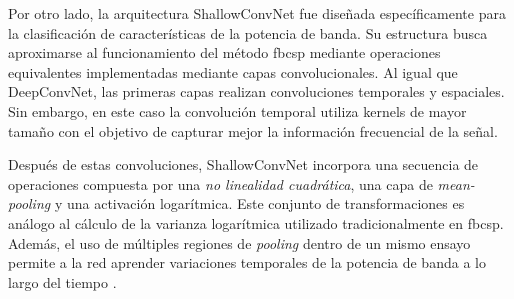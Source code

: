 Por otro lado, la arquitectura ShallowConvNet fue diseñada específicamente para la clasificación de características de la potencia de banda. Su estructura busca aproximarse al funcionamiento del método \acrshort{fbcsp} mediante operaciones equivalentes implementadas mediante capas convolucionales. Al igual que DeepConvNet, las primeras capas realizan convoluciones temporales y espaciales. Sin embargo, en este caso la convolución temporal utiliza kernels de mayor tamaño con el objetivo de capturar mejor la información frecuencial de la señal.

Después de estas convoluciones, ShallowConvNet incorpora una secuencia de operaciones compuesta por una \textit{no linealidad cuadrática}, una capa de \textit{mean-pooling} y una activación logarítmica. Este conjunto de transformaciones es análogo al cálculo de la varianza logarítmica utilizado tradicionalmente en \acrshort{fbcsp}. Además, el uso de múltiples regiones de \textit{pooling} dentro de un mismo ensayo permite a la red aprender variaciones temporales de la potencia de banda a lo largo del tiempo \cite{schirrmeister_DeepLearning2017}.


